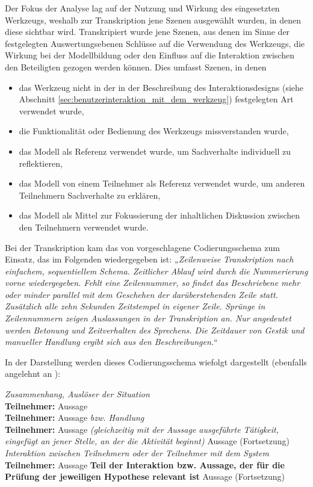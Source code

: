 Der Fokus der Analyse lag auf der Nutzung und Wirkung des eingesetzten Werkzeugs, weshalb zur Transkription jene Szenen ausgewählt wurden, in denen diese sichtbar wird. Transkripiert wurde jene Szenen, aus denen im Sinne der festgelegten Auswertungsebenen Schlüsse auf die Verwendung des Werkzeugs, die Wirkung bei der Modellbildung oder den Einfluss auf die Interaktion zwischen den Beteiligten gezogen werden können. Dies umfasst Szenen, in denen
\begin{itemize}
  \item das Werkzeug nicht in der in der Beschreibung des Interaktionsdesigns (siehe Abschnitt \ref{sec:benutzerinteraktion_mit_dem_werkzeug}) festgelegten Art verwendet wurde,
  \item die Funktionalität oder Bedienung des Werkzeugs missverstanden wurde,
  \item das Modell als Referenz verwendet wurde, um Sachverhalte individuell zu reflektieren,
  \item das Modell von einem Teilnehmer als Referenz verwendet wurde, um anderen Teilnehmern Sachverhalte zu erklären,
  \item das Modell als Mittel zur Fokussierung der inhaltlichen Diskussion zwischen den Teilnehmern verwendet wurde.
\end{itemize}

Bei der Transkription kam das von \citet{Hornecker04} vorgeschlagene Codierungsschema zum Einsatz, das im Folgenden wiedergegeben ist: \emph{„Zeilenweise Transkription nach einfachem, sequentiellem Schema. Zeitlicher Ablauf wird durch die Nummerierung vorne wiedergegeben. Fehlt eine Zeilennummer, so findet das Beschriebene mehr oder minder parallel mit dem Geschehen der darüberstehenden Zeile statt. Zusätzlich alle zehn Sekunden Zeitstempel in eigener Zeile. Sprünge in Zeilennummern zeigen Auslassungen in der Transkription an. Nur angedeutet werden Betonung und Zeitverhalten des Sprechens. Die Zeitdauer von Gestik und manueller Handlung ergibt sich aus den Beschreibungen.“} 

In der Darstellung werden dieses Codierungsschema wiefolgt dargestellt (ebenfalls angelehnt an \citet{Hornecker04}):
\begin{transkript}
	\emph{Zusammenhang, Auslöser der Situation}\\
	\textbf{Teilnehmer:} Aussage\\
	\textbf{Teilnehmer:} Aussage \emph{bzw. Handlung}\\	
	\textbf{Teilnehmer:} Aussage \emph{(gleichzeitig mit der Aussage ausgeführte Tätigkeit, eingefügt an jener Stelle, an der die Aktivität beginnt)} Aussage (Fortsetzung)\\
	\emph{Interaktion zwischen Teilnehmern oder der Teilnehmer mit dem System}\\
	\textbf{Teilnehmer:} Aussage \textbf{Teil der Interaktion bzw. Aussage, der für die Prüfung der jeweiligen Hypothese relevant ist} Aussage (Fortsetzung)\\
\end{transkript}


